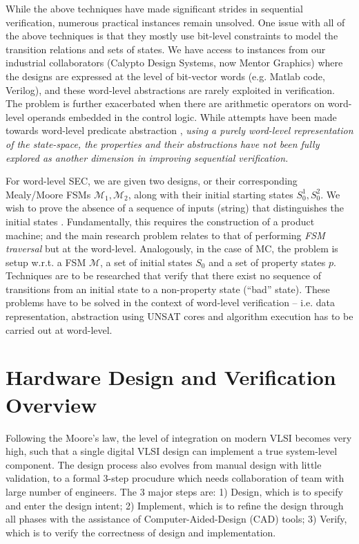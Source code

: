 While the above techniques have made significant strides in sequential
verification, numerous practical instances remain unsolved. One issue
with all of the above techniques is that they mostly use bit-level
constraints to model the transition relations and sets of 
states. We have access to instances from our industrial
collaborators (Calypto Design Systems, now Mentor Graphics) where
the designs are expressed at the level of bit-vector words
(e.g. Matlab code, Verilog), and these word-level abstractions are
rarely exploited in verification. The problem is further exacerbated
when there are arithmetic operators on word-level operands embedded in
the control logic. While attempts have been made towards word-level
predicate abstraction \cite{jain2005word} \cite{mcmillan:cav06}
\cite{mcmillan2010lazy}, {\it using a purely word-level representation
  of the state-space, the properties and their abstractions have not
  been fully explored as another dimension in improving sequential
  verification.}  


For word-level SEC, we are given two designs, or their corresponding
Mealy/Moore FSMs ${\mathcal{M}}_1,{\mathcal{M}}_2$, along with their
initial starting states $S_0^1,S_0^2$. We wish to prove the absence of
a sequence of inputs (string) that distinguishes the initial
states \cite{coudert:iccad90}
\cite{coudert1990verification}. Fundamentally, this requires 
the construction of a product machine; and the main research problem
relates to that of performing {\it FSM traversal} \cite{touati1990implicit}
but  at the word-level. Analogously, in the case of MC, the problem
is setup w.r.t. a FSM $\mathcal{M}$, a set of initial states $S_0$ and
a set of property states $p$. Techniques are to be researched that
verify that there exist no sequence of transitions from an initial
state to a non-property state (``bad'' state). These problems have to
be solved in the context of word-level verification -- i.e. data
representation, abstraction using UNSAT cores and
algorithm execution has to be carried out at word-level.   




\section{Hardware Design and Verification Overview}
Following the Moore's law, the level of integration on modern VLSI becomes very high, 
such that a single digital VLSI design can implement a true system-level component.
The design process also evolves from manual design with little validation, to 
a formal 3-step procudure which needs collaboration of team with large number of 
engineers. The 3 major steps are: 1) Design, which is to specify and enter the design intent;
2) Implement, which is to refine the design through all phases with the assistance of Computer-Aided-Design (CAD)
tools; 3) Verify, which is to verify the correctness of design and implementation.

